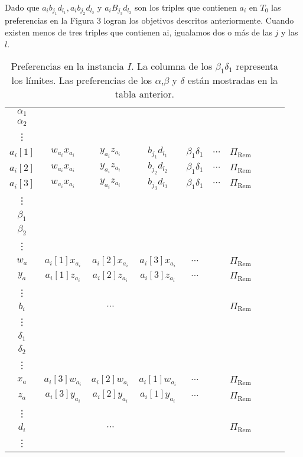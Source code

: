\documentclass{article}
\begin{document}
Dado que $a_ib_{j_1}d_{l_1},a_ib_{j_2}d_{l_2}$ y $a_iB_{j_3}d_{l_3}$ son los triples que contienen $a_i$ en $T_0$
las preferencias en la Figura 3 logran los objetivos descritos anteriormente. Cuando existen menos de tres triples que contienen ai, igualamos dos o más
de las $j$ y las $l$.



\begin{table}[h!]
    \centering
   
    \begin{tabular}{c|ccccccccc}
        $\alpha_1$ & & & & & & & & & \\
        $\alpha_2$ & & & & & & & & & \\
        \vdots     & & & & & & & & & \\
        $a_i[1]$   & $w_{a_i} x_{a_i}$ & $y_{a_i} z_{a_i}$ & $b_{j_1} d_{l_1}$ & $\beta_1 \delta_1$ & $\cdots$ & $\Pi_{\text{Rem}}$ \\
        $a_i[2]$   & $w_{a_i} x_{a_i}$ & $y_{a_i} z_{a_i}$ & $b_{j_2} d_{l_2}$ & $\beta_1 \delta_1$ & $\cdots$ & $\Pi_{\text{Rem}}$ \\
        $a_i[3]$   & $w_{a_i} x_{a_i}$ & $y_{a_i} z_{a_i}$ & $b_{j_3} d_{l_3}$ & $\beta_1 \delta_1$ & $\cdots$ & $\Pi_{\text{Rem}}$ \\
        \vdots     & & & & & & & & & \\
        \hline
        $\beta_1$  & & & & & & & & & \\
        $\beta_2$  & & & & & & & & & \\
        \vdots\\
        $w_a$      & $a_i[1] x_{a_i}$ & $a_i[2] x_{a_i}$ & $a_i[3] x_{a_i}$ & $\cdots$ & & $\Pi_{\text{Rem}}$ \\
        $y_a$      & $a_i[1] z_{a_i}$ & $a_i[2] z_{a_i}$ & $a_i[3] z_{a_i}$ & $\cdots$ & & $\Pi_{\text{Rem}}$ \\
        \vdots     & & & & & & & & & \\
        $b_i$      & & $\cdots$ & & & & $\Pi_{\text{Rem}}$ \\
        \vdots\\
        \hline
        $\delta_1$ & & & & & & & & & \\
        $\delta_2$ & & & & & & & & & \\
        \vdots \\
        $x_a$      & $a_i[3] w_{a_i}$ & $a_i[2] w_{a_i}$ & $a_i[1] w_{a_i}$ & $\cdots$ & & $\Pi_{\text{Rem}}$ \\
        $z_a$      & $a_i[3] y_{a_i}$ & $a_i[2] y_{a_i}$ & $a_i[1] y_{a_i}$ & $\cdots$ & & $\Pi_{\text{Rem}}$ \\
        \vdots     & & & & & & & & & \\
        $d_i$      & & $\cdots$ & & & & $\Pi_{\text{Rem}}$ \\
        \vdots     & & & & & & & & & \\
    \end{tabular}
    \caption{Preferencias en la instancia $I$. La columna de los $\beta_1 \delta_1$ representa los límites. Las preferencias de los $\alpha$,$\beta$ y $\delta$ están mostradas en la tabla anterior. }  
\end{table}
\end{document}

